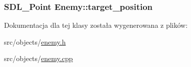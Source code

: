\subsubsection[{target\+\_\+position}]{\setlength{\rightskip}{0pt plus 5cm}S\+D\+L\+\_\+\+Point Enemy\+::target\+\_\+position}\label{class_enemy_abb410f03f34e4a1ce889ef8441382eb0}


Dokumentacja dla tej klasy została wygenerowana z plików\+:\begin{DoxyCompactItemize}
\item 
src/objects/\hyperlink{enemy_8h}{enemy.\+h}\item 
src/objects/\hyperlink{enemy_8cpp}{enemy.\+cpp}\end{DoxyCompactItemize}
